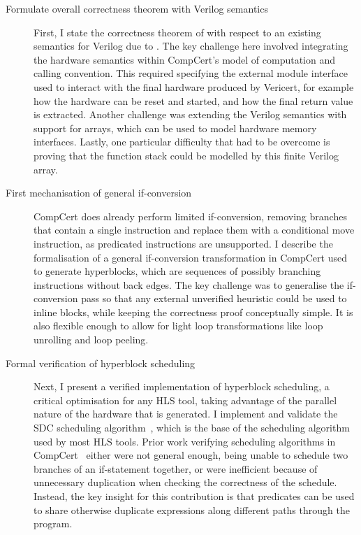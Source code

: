 \begin{description}
\item[Formulate overall correctness theorem with Verilog semantics] First, I
  state the correctness theorem of \vericert{} with respect to an existing
  semantics for Verilog due to \textcite{lööw19_proof_trans_veril_devel_hol}.
  The key challenge here involved integrating the hardware semantics within
  CompCert's model of computation and calling convention.  This required
  specifying the external module interface used to interact with the final
  hardware produced by Vericert, for example how the hardware can be reset and
  started, and how the final return value is extracted.  Another challenge was
  extending the Verilog semantics with support for arrays, which can be used to
  model hardware memory interfaces.  Lastly, one particular difficulty that had
  to be overcome is proving that the function stack could be modelled by this
  finite Verilog array.

\item[First mechanisation of general if-conversion] CompCert does already
  perform limited if-conversion, removing branches that contain a single
  instruction and replace them with a conditional move instruction, as
  predicated instructions are unsupported.  I describe the formalisation of a
  general if-conversion transformation in CompCert used to generate hyperblocks,
  which are sequences of possibly branching instructions without back edges.
  The key challenge was to generalise the if-conversion pass so that any
  external unverified heuristic could be used to inline blocks, while keeping
  the correctness proof conceptually simple.  It is also flexible enough to
  allow for light loop transformations like loop unrolling and loop peeling.

\item[Formal verification of hyperblock scheduling] Next, I present a verified
  implementation of hyperblock scheduling, a critical optimisation for any
  \gls{HLS} tool, taking advantage of the parallel nature of the hardware that
  is generated.  I implement and validate the \gls{SDC} scheduling
  algorithm~\cite{cong06_sdc}, which is the base of the scheduling algorithm
  used by most \gls{HLS} tools.  Prior work verifying scheduling algorithms in
  CompCert~\cite{tristan08_formal_verif_trans_valid,
    six22_formal_verif_super_sched} either were not general enough, being unable
  to schedule two branches of an if-statement together, or were inefficient
  because of unnecessary duplication when checking the correctness of the
  schedule.  Instead, the key insight for this contribution is that predicates
  can be used to share otherwise duplicate expressions along different paths
  through the program.


\end{description}
